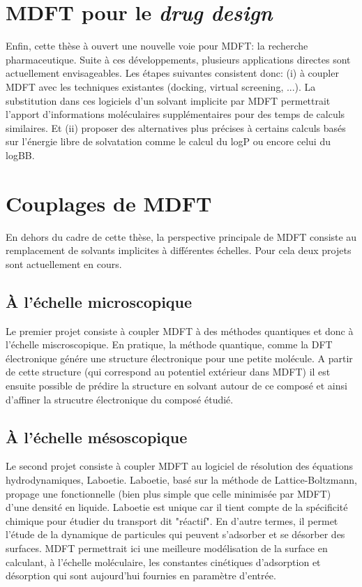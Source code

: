 \section{MDFT pour le \textit{drug design}}
Enfin, cette thèse à ouvert une nouvelle voie pour MDFT: la recherche pharmaceutique. Suite à ces développements, plusieurs applications directes sont actuellement envisageables. Les étapes suivantes consistent donc: (i) à coupler MDFT avec les techniques existantes (docking, virtual screening, ...). La substitution dans ces logiciels d'un solvant implicite par MDFT permettrait l'apport d'informations moléculaires supplémentaires pour des temps de calculs similaires. Et (ii) proposer des alternatives plus précises à certains calculs basés sur l'énergie libre de solvatation comme le calcul du logP ou encore celui du logBB.

\section{Couplages de MDFT}
En dehors du cadre de cette thèse, la perspective principale de MDFT consiste au remplacement de solvants implicites à différentes échelles. Pour cela deux projets sont actuellement en cours.
\subsection{\`A l'échelle microscopique}
Le premier projet consiste à coupler MDFT à des méthodes quantiques et donc à l'échelle miscroscopique. En pratique, la méthode quantique, comme la DFT électronique génére une structure électronique pour une petite molécule. A partir de cette structure (qui correspond au potentiel extérieur dans MDFT) il est ensuite possible de prédire la structure en solvant autour de ce composé et ainsi d'affiner la strucutre électronique du composé étudié.


\subsection{\`A l'échelle mésoscopique}
Le second projet consiste à coupler MDFT au logiciel de résolution des équations hydrodynamiques, Laboetie\cite{Levesque_accounting_2013,Vanson_unexpected_2015,Asta_transient_2017}. Laboetie, basé sur la méthode de Lattice-Boltzmann, propage une fonctionnelle (bien plus simple que celle minimisée par MDFT) d'une densité en liquide. Laboetie est unique car il tient compte de la spécificité chimique pour étudier du transport dit "réactif". En d'autre termes, il permet l'étude de la dynamique de particules qui peuvent s'adsorber et se désorber des surfaces.
MDFT permettrait ici une meilleure modélisation de la surface en calculant, à l'échelle moléculaire, les constantes cinétiques d'adsorption et désorption qui sont aujourd'hui fournies en paramètre d'entrée.



